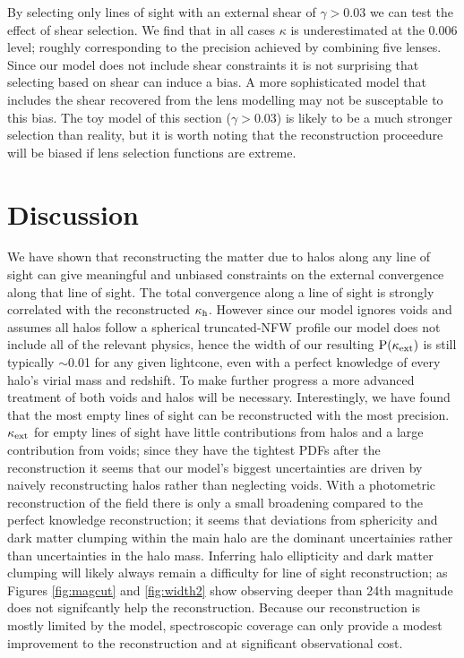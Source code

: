 \documentclass[useAMS,usenatbib]{mn2e}
\begin{document}
By selecting only lines of sight with an external shear of $\gamma>0.03$ we can test the effect of shear selection. We find that in all cases $\kappa$ is underestimated at the 0.006 level; roughly corresponding to the precision achieved by combining five lenses. Since our model does not include shear constraints it is not surprising that selecting based on shear can induce a bias. A more sophisticated model that includes the shear recovered from the lens modelling may not be susceptable to this bias. The toy model of this section ($\gamma>0.03$) is likely to be a much stronger selection than reality, but it is worth noting that the reconstruction proceedure will be biased if lens selection functions are extreme.



\section{Discussion}
\label{sec:discuss}

We have shown that reconstructing the matter due to halos along any line of sight can give meaningful and unbiased constraints on the external convergence along that line of sight. The total convergence along a line of sight is strongly correlated with the reconstructed $\kappa_{\rm h}$. However since our model ignores voids and assumes all halos follow a spherical truncated-NFW profile our model does not include all of the relevant physics, hence the width of our resulting ${\rm P}(\kappa_{\rm ext})$ is still typically $\sim$0.01 for any given lightcone, even with a perfect knowledge of every halo's virial mass and redshift. To make further progress a more advanced treatment of both voids and halos will be necessary. Interestingly, we have found that the most empty lines of sight can be reconstructed with the most precision. $\kappa_{\rm ext}$ for empty lines of sight have little contributions from halos and a large contribution from voids; since they have the tightest PDFs after the reconstruction it seems that our model's biggest uncertainties are driven by naively reconstructing halos rather than neglecting voids. With a photometric reconstruction of the field there is only a small broadening compared to the perfect knowledge reconstruction; it seems that deviations from sphericity and dark matter clumping within the main halo are the dominant uncertainies rather than uncertainties in the halo mass. Inferring halo ellipticity and dark matter clumping will likely always remain a difficulty for line of sight reconstruction; as Figures \ref{fig:magcut} and \ref{fig:width2} show observing deeper than 24th magnitude does not signifcantly help the reconstruction. Because our reconstruction is mostly limited by the model, spectroscopic coverage can only provide a modest improvement to the reconstruction and at significant observational cost.
\end{document}
